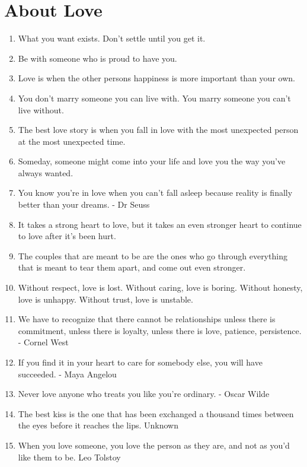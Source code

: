     \section*{About Love}
        \begin{enumerate}
            \item What you want exists. Don’t settle until you get it.

            \item Be with someone who is proud to have you.

            \item Love is when the other persons happiness is more important than your own.

            \item You don’t marry someone you can live with. You marry someone you can’t live without.

            \item The best love story is when you fall in love with the most unexpected person at the most unexpected time.

            \item Someday, someone might come into your life and love you the way you’ve always wanted.

            \item You know you’re in love when you can’t fall asleep because reality is finally better than your dreams. - Dr Seuss

            \item It takes a strong heart to love, but it takes an even stronger heart to continue to love after it’s been hurt.

            \item The couples that are meant to be are the ones who go through everything that is meant to tear them apart, and come out even stronger.

            \item Without respect, love is lost. Without caring, love is boring. Without honesty, love is unhappy. Without trust, love is unstable.

            \item We have to recognize that there cannot be relationships unless there is commitment, unless there is loyalty, unless there is love, patience, persistence. - Cornel West

            \item If you find it in your heart to care for somebody else, you will have succeeded. - Maya Angelou

            \item Never love anyone who treats you like you’re ordinary. - Oscar Wilde

            \item The best kiss is the one that has been exchanged a thousand times between the eyes before it reaches the lips. Unknown

            \item When you love someone, you love the person as they are, and not as you’d like them to be. Leo Tolstoy
        \end{enumerate}

